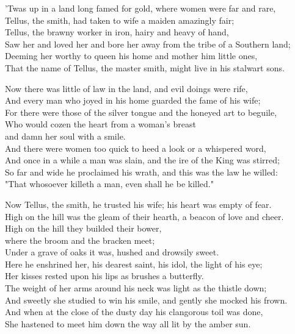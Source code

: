 
\begin{poemblock}
'Twas up in a land long famed for gold, where women were far and rare,\\
Tellus, the smith, had taken to wife a maiden amazingly fair;\\
Tellus, the brawny worker in iron, hairy and heavy of hand,\\
Saw her and loved her and bore her away from the tribe of a Southern land;\\
Deeming her worthy to queen his home and mother him little ones,\\
That the name of Tellus, the master smith, might live in his stalwart sons.

Now there was little of law in the land, and evil doings were rife,\\
And every man who joyed in his home guarded the fame of his wife;\\
For there were those of the silver tongue and the honeyed art to beguile,\\
Who would cozen the heart from a woman's breast\\
\idt  and damn her soul with a smile.\\
And there were women too quick to heed a look or a whispered word,\\
And once in a while a man was slain, and the ire of the King was stirred;\\
So far and wide he proclaimed his wrath, and this was the law he willed:\\
"That whosoever killeth a man, even shall he be killed."

Now Tellus, the smith, he trusted his wife; his heart was empty of fear.\\
High on the hill was the gleam of their hearth, a beacon of love and cheer.\\
High on the hill they builded their bower,\\
\idt  where the broom and the bracken meet;\\
Under a grave of oaks it was, hushed and drowsily sweet.\\
Here he enshrined her, his dearest saint, his idol, the light of his eye;\\
Her kisses rested upon his lips as brushes a butterfly.\\
The weight of her arms around his neck was light as the thistle down;\\
And sweetly she studied to win his smile, and gently she mocked his frown.\\
And when at the close of the dusty day his clangorous toil was done,\\
She hastened to meet him down the way all lit by the amber sun.


\end{poemblock}
